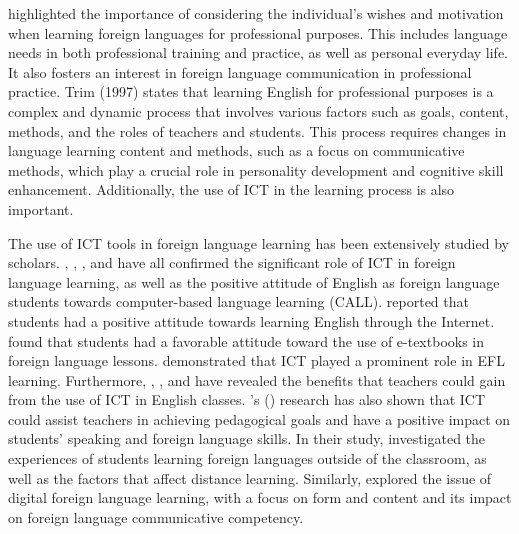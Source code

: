 \textcite[p. 2]{egloff1997languages} highlighted the importance of considering the individual’s wishes and motivation when learning foreign languages for professional purposes. This includes language needs in both professional training and practice, as well as personal everyday life. It also fosters an interest in foreign language communication in professional practice. Trim (1997) states that learning English for professional purposes is a complex and dynamic process that involves various factors such as goals, content, methods, and the roles of teachers and students. This process requires changes in language learning content and methods, such as a focus on communicative methods, which play a crucial role in personality development and cognitive skill enhancement. Additionally, the use of ICT in the learning process is also important.

The use of ICT tools in foreign language learning has been extensively studied by scholars. \textcite{ebadi2017exploring}, \textcite{hsu2017efl}, \textcite{jalali2014attitudes}, and \textcite{oz2015investigating} have all confirmed the significant role of ICT in foreign language learning, as well as the positive attitude of English as foreign language students towards computer-based language learning (CALL). \textcite{yao2016research}  reported that students had a positive attitude towards learning English through the Internet. \cite{hsu2017efl} found that students had a favorable attitude toward the use of e-textbooks in foreign language lessons. \textcite{alshabeb2018study} demonstrated that ICT played a prominent role in EFL learning. Furthermore, \textcite{sutherland2004transforming}, \textcite{rosa2016experiences}, and \textcite{awada2020effect} have revealed the benefits that teachers could gain from the use of ICT in English classes. \citeauthor{rokenes2016prepared}’s (\citeyear{rokenes2016prepared}) research has also shown that ICT could assist teachers in achieving pedagogical goals and have a positive impact on students’ speaking and foreign language skills. In their \citeyear{lai2018understanding} study, \citeauthor{lai2018understanding} investigated the experiences of students learning foreign languages outside of the classroom, as well as the factors that affect distance learning. Similarly, \textcite{lee2018when} explored the issue of digital foreign language learning, with a focus on form and content and its impact on foreign language communicative competency.

